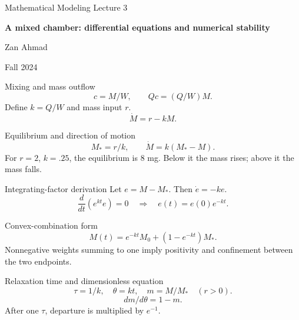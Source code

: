 \documentclass[aspectratio=169,11pt]{beamer}
\newcommand{\notestarget}{notes.pdf}\newcommand{\noteslabel}{Notes}
\begin{document}
\begin{frame}[plain]\vfill
{\small\color{accent} Mathematical Modeling \quad Lecture 3}\par\medskip
{\raggedright{}\LARGE\bfseries\color{ink} A mixed chamber: differential equations and numerical stability}\par\bigskip
Zan Ahmad\par\smallskip
{\small Fall 2024}\par\vfill\end{frame}
\renewcommand{\notestarget}{notes.pdf\#note-concentration-and-the-removal-law}
\begin{frame}[t,fragile,label=slide-mixing-and-mass-outflow]{Mixing and mass outflow}
\[c=M/W,\qquad Qc=(Q/W)M.\]\pause{} Define $k=Q/W$ and mass input $r$.\[\dot M=r-kM.\]
\end{frame}
\renewcommand{\notestarget}{notes.pdf\#note-equilibrium-and-the-integrating-factor}
\begin{frame}[t,fragile,label=slide-equilibrium-and-direction-of-motion]{Equilibrium and direction of motion}
\[M_*=r/k,\qquad\dot M=k(M_*-M).\]\pause{} For $r=2$, $k=.25$, the equilibrium is $8$ mg. Below it the mass rises; above it the mass falls.
\end{frame}
\renewcommand{\notestarget}{notes.pdf\#note-equilibrium-and-the-integrating-factor}
\begin{frame}[t,fragile,label=slide-integrating-factor-derivation]{Integrating-factor derivation}
Let $e=M-M_*$. Then $\dot e=-ke$.\pause{}\[\frac{d}{dt}(e^{kt}e)=0\quad\Rightarrow\quad e(t)=e(0)e^{-kt}.\]
\end{frame}
\renewcommand{\notestarget}{notes.pdf\#note-equilibrium-and-the-integrating-factor}
\begin{frame}[t,fragile,label=slide-convex-combination-form]{Convex-combination form}
\[M(t)=e^{-kt}M_0+(1-e^{-kt})M_*.\]\pause{} Nonnegative weights summing to one imply positivity and confinement between the two endpoints.
\end{frame}
\renewcommand{\notestarget}{notes.pdf\#note-equilibrium-and-the-integrating-factor}
\begin{frame}[t,fragile,label=slide-relaxation-time-and-dimensionless-equation]{Relaxation time and dimensionless equation}
\[\tau=1/k,\quad\theta=kt,\quad m=M/M_*\quad(r>0).\]\pause{}\[dm/d\theta=1-m.\]After one $\tau$, departure is multiplied by $e^{-1}$.
\end{frame}
\renewcommand{\notestarget}{notes.pdf\#note-forward-euler-as-a-quadrature-approximation}
\end{document}

